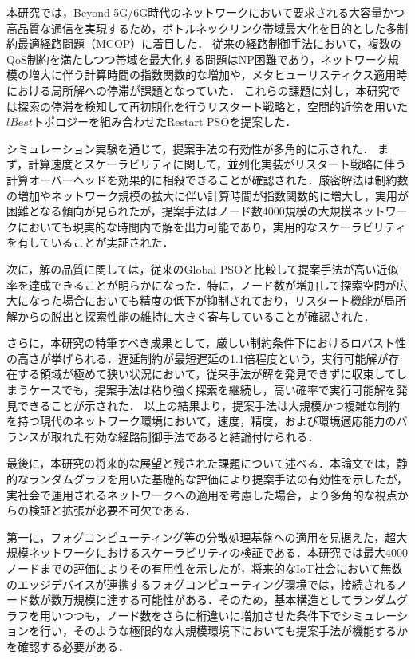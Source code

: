 
本研究では，Beyond 5G/6G時代のネットワークにおいて要求される大容量かつ高品質な通信を実現するため，ボトルネックリンク帯域最大化を目的とした多制約最適経路問題（MCOP）に着目した．
従来の経路制御手法において，複数のQoS制約を満たしつつ帯域を最大化する問題はNP困難であり，ネットワーク規模の増大に伴う計算時間の指数関数的な増加や，メタヒューリスティクス適用時における局所解への停滞が課題となっていた．
これらの課題に対し，本研究では探索の停滞を検知して再初期化を行うリスタート戦略と，空間的近傍を用いた$lBest$トポロジーを組み合わせたRestart PSOを提案した．

シミュレーション実験を通じて，提案手法の有効性が多角的に示された．
まず，計算速度とスケーラビリティに関して，並列化実装がリスタート戦略に伴う計算オーバーヘッドを効果的に相殺できることが確認された．厳密解法は制約数の増加やネットワーク規模の拡大に伴い計算時間が指数関数的に増大し，実用が困難となる傾向が見られたが，提案手法はノード数4000規模の大規模ネットワークにおいても現実的な時間内で解を出力可能であり，実用的なスケーラビリティを有していることが実証された．

次に，解の品質に関しては，従来のGlobal PSOと比較して提案手法が高い近似率を達成できることが明らかになった．特に，ノード数が増加して探索空間が広大になった場合においても精度の低下が抑制されており，リスタート機能が局所解からの脱出と探索性能の維持に大きく寄与していることが確認された．

さらに，本研究の特筆すべき成果として，厳しい制約条件下におけるロバスト性の高さが挙げられる．遅延制約が最短遅延の1.1倍程度という，実行可能解が存在する領域が極めて狭い状況において，従来手法が解を発見できずに収束してしまうケースでも，提案手法は粘り強く探索を継続し，高い確率で実行可能解を発見できることが示された．
以上の結果より，提案手法は大規模かつ複雑な制約を持つ現代のネットワーク環境において，速度，精度，および環境適応能力のバランスが取れた有効な経路制御手法であると結論付けられる．


最後に，本研究の将来的な展望と残された課題について述べる．本論文では，静的なランダムグラフを用いた基礎的な評価により提案手法の有効性を示したが，実社会で運用されるネットワークへの適用を考慮した場合，より多角的な視点からの検証と拡張が必要不可欠である．

第一に，フォグコンピューティング等の分散処理基盤への適用を見据えた，超大規模ネットワークにおけるスケーラビリティの検証である．本研究では最大4000ノードまでの評価によりその有用性を示したが，将来的なIoT社会において無数のエッジデバイスが連携するフォグコンピューティング環境では，接続されるノード数が数万規模に達する可能性がある．そのため，基本構造としてランダムグラフを用いつつも，ノード数をさらに桁違いに増加させた条件下でシミュレーションを行い，そのような極限的な大規模環境下においても提案手法が機能するかを確認する必要がある．

